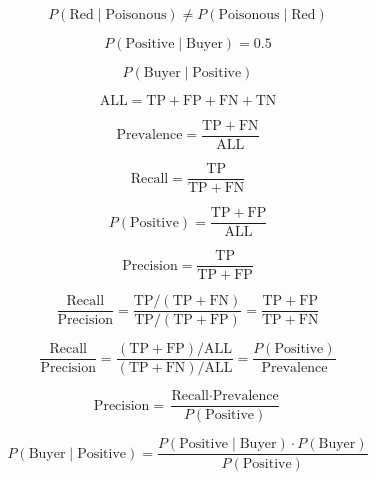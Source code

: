 \documentclass[border=4pt,multi={formula}]{standalone}
\newenvironment{formula}{\begin{minipage}{11in}\centering\Large}{\end{minipage}}
\newcommand{\code}[1]{\mathrm{#1}}
\begin{document}
\begin{formula}
\[
P(\text{Red}\mid\text{Poisonous}) \ne P(\text{Poisonous}\mid\text{Red})
\]
\end{formula}

\begin{formula}
\[
P(\text{Positive}\mid\text{Buyer}) = 0.5
\]
\end{formula}

\begin{formula}
\[
P(\text{Buyer}\mid\text{Positive})
\]
\end{formula}

\begin{formula}
\[
\code{ALL} = \code{TP} + \code{FP} + \code{FN} + \code{TN}
\]
\end{formula}

\begin{formula}
\[
\text{Prevalence} = \frac{\code{TP} + \code{FN}}{\code{ALL}}
\]
\end{formula}

\begin{formula}
\[
\text{Recall} = \frac{\code{TP}}{\code{TP} + \code{FN}}
\]
\end{formula}

\begin{formula}
\[
P(\text{Positive}) = \frac{\code{TP} + \code{FP}}{\code{ALL}}
\]
\end{formula}

\begin{formula}
\[
\text{Precision} = \frac{\code{TP}}{\code{TP} + \code{FP}}
\]
\end{formula}

\begin{formula}
\[
\frac{\text{Recall}}{\text{Precision}}
= \frac{\code{TP}/(\code{TP}+\code{FN})}{\code{TP}/(\code{TP}+\code{FP})}
= \frac{\code{TP}+\code{FP}}{\code{TP}+\code{FN}}
\]
\end{formula}

\begin{formula}
\[
\frac{\text{Recall}}{\text{Precision}}
= \frac{(\code{TP}+\code{FP})/\code{ALL}}{(\code{TP}+\code{FN})/\code{ALL}}
= \frac{P(\text{Positive})}{\text{Prevalence}}
\]
\end{formula}

\begin{formula}
\[
\text{Precision} = \frac{\text{Recall}\cdot\text{Prevalence}}{P(\text{Positive})}
\]
\end{formula}

\begin{formula}
\[
P(\text{Buyer}\mid\text{Positive}) =
\frac{P(\text{Positive}\mid\text{Buyer})\cdot P(\text{Buyer})}{P(\text{Positive})}
\]
\end{formula}
\end{document}
